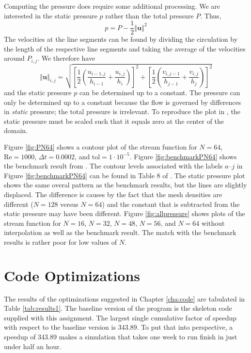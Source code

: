 Computing the pressure does require some additional processing. We are interested in the static pressure $p$ rather than the total pressure $P$. Thus, 
\begin{equation}
    p = P - \frac{1}{2} \left\Vert \mathbf{u} \right\Vert^2
\end{equation}
The velocities at the line segments can be found by dividing the circulation by the length of the respective line segments and taking the average of the velocities around $P_{i,j}$. We therefore have
\begin{equation}
    \left\Vert \mathbf{u} \right\Vert_{i,j} = \sqrt{\left[ \frac{1}{2} \left( \frac{u_{i-1,j}}{h_{i-1}} + \frac{u_{i,j}}{h_i} \right) \right]^2 + \left[ \frac{1}{2} \left( \frac{v_{i,j-1}}{h_{j-1}} + \frac{v_{i,j}}{h_j} \right) \right]^2}
\end{equation}
and the static pressure $p$ can be determined up to a constant. The pressure can only be determined up to a constant because the flow is governed by differences in \emph{static} pressure; the total pressure is irrelevant. To reproduce the plot in \parencite{botella1998benchmark}, the static pressure must be scaled such that it equals zero at the center of the domain.

Figure \ref{fig:PN64} shows a contour plot of the stream function for $N = 64$, $\text{Re} = 1000$, $\Delta t = 0.0002$, and $\text{tol} = 1 \cdot 10^{-5}$. Figure \ref{fig:benchmarkPN64} shows the benchmark result from \parencite{botella1998benchmark}. The contour levels associated with the labels $a$--$j$ in Figure \ref{fig:benchmarkPN64} can be found in Table 8 of \parencite{botella1998benchmark}. The static pressure plot shows the same overal pattern as the benchmark results, but the lines are slightly displaced. The difference is causes by the fact that the mesh densities are different ($N = 128$ versus $N = 64$) and the constant that is subtracted from the static pressure may have been different. Figure \ref{fig:allpressure} shows plots of the stream function for $N = 16$, $N = 32$, $N = 48$, $N = 56$, and $N = 64$ without interpolation as well as the benchmark result. The match with the benchmark results is rather poor for low values of $N$.

\section{Code Optimizations}

The results of the optimizations suggested in Chapter \ref{cha:code} are tabulated in Table \ref{tab:results1}. The baseline version of the program is the skeleton code supplied with this assignment. The largest single cumulative factor of speedup with respect to the baseline version is 343.89. To put that into perspective, a speedup of 343.89 makes a simulation that takes one week to run finish in just under half an hour.

